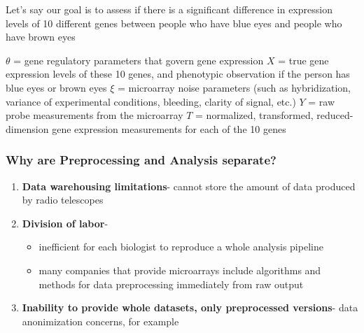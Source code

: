 \documentclass[10pt, compress]{beamer}
\begin{document}
\begin{frame}[fragile]
    
    Let's say our goal is to assess if there is a significant difference in expression levels of 10 different genes between people
    who have blue eyes and people who have brown eyes

    $\theta$ = gene regulatory parameters that govern gene expression
    $X$ = true gene expression levels of these 10 genes, and phenotypic observation if the person has blue eyes or brown eyes
    $\xi$ = microarray noise parameters (such as hybridization, variance of experimental conditions, bleeding, clarity of signal, etc.)
    $Y$ = raw probe measurements from the microarray
    $T$ = normalized, transformed, reduced-dimension gene expression measurements for each of the 10 genes

\end{frame}


\begin{frame}[fragile]
    \frametitle{Why are Preprocessing and Analysis separate?}
    
    \begin{enumerate} 
    \item \textbf{Data warehousing limitations}- cannot store the amount of data produced by radio telescopes
    \vspace*{3mm}
    \item \textbf{Division of labor}- 
        \begin{itemize}
        \item inefficient for each biologist to reproduce a whole analysis pipeline 
        \item many companies that provide microarrays include algorithms and methods for data preprocessing immediately from raw output
        \end{itemize}
    \vspace*{3mm}
    \item \textbf{Inability to provide whole datasets, only preprocessed versions}- data anonimization concerns, for example
    \end{enumerate}

\end{frame}
\end{document}
